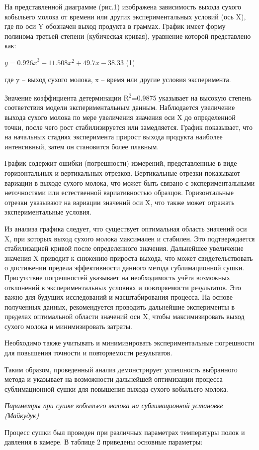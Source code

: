 \begin{multicols}{2}

На представленной диаграмме (рис.1) изображена зависимость выхода сухого
кобыльего молока от времени или других экспериментальных условий (ось
X), где по оси Y обозначен выход продукта в граммах. График имеет форму
полинома третьей степени (кубическая кривая), уравнение которой
представлено как:

\(y = {0.926x}^{3} - 11.508x^{2} + 49.7x - 38.33\) (1)

где y -- выход сухого молока, x -- время или другие условия
эксперимента.

Значение коэффициента детерминации R\textsuperscript{2}=0.9875 указывает
на высокую степень соответствия модели экспериментальным данным.
Наблюдается увеличение выхода сухого молока по мере увеличения значения
оси X до определенной точки, после чего рост стабилизируется или
замедляется. График показывает, что на начальных стадиях эксперимента
прирост выхода продукта наиболее интенсивный, затем он становится более
плавным.

График содержит ошибки (погрешности) измерений, представленные в виде
горизонтальных и вертикальных отрезков. Вертикальные отрезки показывают
вариации в выходе сухого молока, что может быть связано с
экспериментальными неточностями или естественной вариативностью
образцов. Горизонтальные отрезки указывают на вариации значений оси X,
что также может отражать экспериментальные условия.

Из анализа графика следует, что существует оптимальная область значений
оси X, при которых выход сухого молока максимален и стабилен. Это
подтверждается стабилизацией кривой после определенного значения.
Дальнейшее увеличение значения X приводит к снижению прироста выхода,
что может свидетельствовать о достижении предела эффективности данного
метода сублимационной сушки. Присутствие погрешностей указывает на
необходимость учёта возможных отклонений в экспериментальных условиях и
повторяемости результатов. Это важно для будущих исследований и
масштабирования процесса. На основе полученных данных, рекомендуется
проводить дальнейшие эксперименты в пределах оптимальной области
значений оси X, чтобы максимизировать выход сухого молока и
минимизировать затраты.

Необходимо также учитывать и минимизировать экспериментальные
погрешности для повышения точности и повторяемости результатов.

Таким образом, проведенный анализ демонстрирует успешность выбранного
метода и указывает на возможности дальнейшей оптимизации процесса
сублимационной сушки для повышения выхода сухого кобыльего молока.

\emph{Параметры при сушке кобыльего молока на сублимационной установке
(Майкудук)}

Процесс сушки был проведен при различных параметрах температуры полок и
давления в камере. В таблице 2 приведены основные параметры:

\end{multicols}


